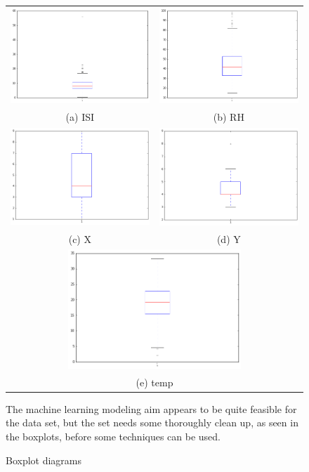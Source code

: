 \begin{figure}
\begin{tabular}{cc}
 \includegraphics[width=65mm]{images/boxplots/ISI.png} &   \includegraphics[width=65mm]{images/boxplots/RH.png} \\
(a) ISI & (b) RH \\[6pt]
  \includegraphics[width=65mm]{images/boxplots/x.png} &   \includegraphics[width=65mm]{images/boxplots/y.png} \\
(c) X & (d) Y \\[6pt]
\multicolumn{2}{c}{\includegraphics[width=65mm]{images/boxplots/temp.png} }\\
\multicolumn{2}{c}{(e) temp}
\end{tabular}
\caption{Boxplot diagrams}

The machine learning modeling aim appears to be quite feasible for the data set, but the set needs some thoroughly clean up, as seen in the boxplots, before some techniques can be used. 
\end{figure}